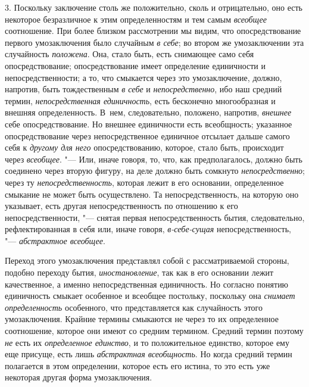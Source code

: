 3. Поскольку заключение столь же положительно, сколь и
отрицательно, оно есть некоторое безразличное к этим определенностям и тем
самым {\em всеобщее} соотношение. При более близком рассмотрении мы видим, что
опосредствование первого умозаключения было случайным {\em в себе}; во втором
же умозаключении эта случайность {\em положена}. Она,
стало быть, есть снимающее само себя опосредствование; опосредствование
имеет определение единичности и непосредственности; а то, что смыкается
через это умозаключение, должно, напротив, быть тождественным
{\em в себе} и {\em непосредственно}, ибо наш средний термин,
{\em непосредственная единичность},
есть бесконечно многообразная и внешняя определенность.
В~нем, следовательно, положено, напротив, {\em внешнее} себе
опосредствование. Но внешнее единичности есть всеобщность; указанное
опосредствование через непосредственное единичное отсылает дальше самого
себя к {\em другому для него}
опосредствованию, которое, стало быть, происходит через
{\em всеобщее}. "--- Или,
иначе говоря, то, что, как предполагалось, должно быть соединено через
вторую фигуру, на деле должно быть сомкнуто {\em непосредственно};
через ту {\em непосредственность},
которая лежит в его основании, определенное смыкание не может
быть осуществлено. Та непосредственность, на которую оно указывает, есть
другая непосредственность по отношению к его непосредственности, "---
снятая первая непосредственность бытия, следовательно,
рефлектированная в себя или, иначе говоря,
{\em в-себе-сущая}
непосредственность, "---
{\em абстрактное всеобщее}.

Переход этого умозаключения представлял собой с
рассматриваемой стороны, подобно переходу бытия, {\em иностановление},
так как в его основании лежит качественное, а именно
непосредственная единичность. Но согласно понятию единичность смыкает
особенное и всеобщее постольку, поскольку она
{\em снимает определенность}
особенного, что представляется как случайность этого
умозаключения. Крайние термины смыкаются не через то их определенное
соотношение, которое они имеют со средним термином. Средний термин поэтому
{\em не} есть их
{\em определенное единство},
и то положительное единство, которое ему еще присуще, есть
лишь {\em абстрактная всеобщность}.
Но когда средний термин полагается в этом определении,
которое есть его истина, то это есть уже некоторая другая форма
умозаключения.

